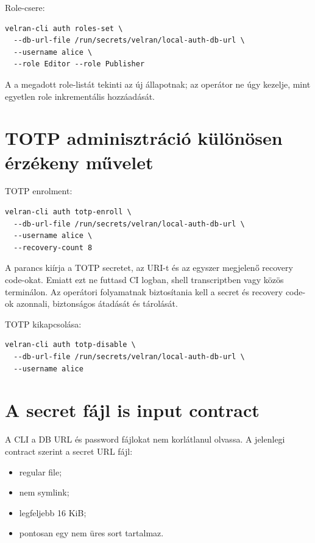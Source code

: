 Role-csere:

\begin{lstlisting}
velran-cli auth roles-set \
  --db-url-file /run/secrets/velran/local-auth-db-url \
  --username alice \
  --role Editor --role Publisher
\end{lstlisting}

A  a megadott role-listát tekinti az új állapotnak; az operátor ne úgy kezelje, mint egyetlen role inkrementális hozzáadását.

\section{TOTP adminisztráció különösen érzékeny művelet}

TOTP enrolment:

\begin{lstlisting}
velran-cli auth totp-enroll \
  --db-url-file /run/secrets/velran/local-auth-db-url \
  --username alice \
  --recovery-count 8
\end{lstlisting}

A parancs kiírja a TOTP secretet, az  URI-t és az egyszer megjelenő recovery code-okat. Emiatt ezt ne futtasd CI logban, shell transcriptben vagy közös terminálon. Az operátori folyamatnak biztosítania kell a secret és recovery code-ok azonnali, biztonságos átadását és tárolását.

TOTP kikapcsolása:

\begin{lstlisting}
velran-cli auth totp-disable \
  --db-url-file /run/secrets/velran/local-auth-db-url \
  --username alice
\end{lstlisting}

\section{A secret fájl is input contract}

A CLI a DB URL és password fájlokat nem korlátlanul olvassa. A jelenlegi contract szerint a secret URL fájl:

\begin{itemize}
  \item regular file;
  \item nem symlink;
  \item legfeljebb 16 KiB;
  \item pontosan egy nem üres sort tartalmaz.
\end{itemize}

